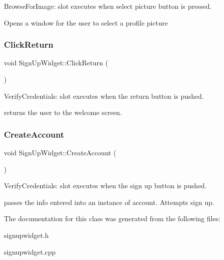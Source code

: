 Browse\+For\+Image\+: slot executes when select picture button is pressed. 

Opens a window for the user to select a profile picture \mbox{\label{classSignUpWidget_ab4af9be338fd97119fe6e01234da8a80}} 
\subsubsection{\texorpdfstring{Click\+Return}{ClickReturn}}
{\footnotesize\ttfamily void Sign\+Up\+Widget\+::\+Click\+Return (\begin{DoxyParamCaption}{ }\end{DoxyParamCaption})\hspace{0.3cm}{\ttfamily [slot]}}



Verify\+Credentials\+: slot executes when the return button is pushed. 

returns the user to the welcome screen. \mbox{\label{classSignUpWidget_af5d2a451a5552737ccdb9c14b5a75ad5}} 
\subsubsection{\texorpdfstring{Create\+Account}{CreateAccount}}
{\footnotesize\ttfamily void Sign\+Up\+Widget\+::\+Create\+Account (\begin{DoxyParamCaption}{ }\end{DoxyParamCaption})\hspace{0.3cm}{\ttfamily [slot]}}



Verify\+Credentials\+: slot executes when the sign up button is pushed. 

passes the info entered into an instance of account. Attempts sign up. 

The documentation for this class was generated from the following files\+:\begin{DoxyCompactItemize}
\item 
signupwidget.\+h\item 
signupwidget.\+cpp\end{DoxyCompactItemize}
